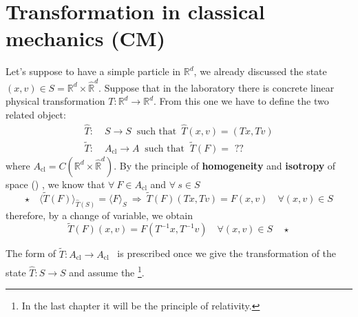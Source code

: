 \documentclass[../main.tex]{subfiles}
\begin{document}
\section[Transformation in CM]{Transformation in classical mechanics (CM)}
Let's suppose to have a simple particle in $\mathbb{R}^d$, we already discussed the state $(x,v)\in S=\mathbb{R}^d\times \hat{\mathbb{R}}^d$. Suppose that in the laboratory there is concrete linear physical transformation $T: \mathbb{R}^d\to\mathbb{R}^d$. From this one we have to define the two related object:
\begin{align*}
\hat{T}:\; &S \rightarrow S \ \mbox{ such that } \, \hat{T}(x,v)=(Tx,Tv)\\
\tilde{T}:\; &A_{\textrm{cl}} \to A \ \textrm{ such that } \ \tilde{T}(F) = \textrm{ ??}
\end{align*}
where $A_{\textrm{cl}}=C(\mathbb{R}^d\times\hat{\mathbb{R}}^d)$. By the principle of \textbf{homogeneity} and \textbf{isotropy} of space () , we know that $\forall \ F \in A_{\textrm{cl}}$ and $\forall \ s \in S$ 
\[
\star \quad \langle \tilde{T}(F) \rangle_{\hat{T}(S)}=\langle F \rangle_S \ \Rightarrow \ \tilde{T}(F)(Tx,Tv)=F(x,v) \quad \forall (x,v)\in S
\]
therefore, by a change of variable, we obtain $$\tilde{T}(F)(x,v)=F(T^{-1}x,T^{-1}v) \quad \forall (x,v)\in S \quad \star$$
\begin{kaobox}[frametitle=Moral]
The form of $\tilde{T}:A_{\textrm{cl}} \xrightarrow[]{} A_{\textrm{cl}}$ \, is prescribed once we give the transformation of the state $\hat{T}:S \rightarrow S$ and assume the \footnote{In the last chapter it will be the principle of relativity.}.
\end{kaobox}
\end{document}
